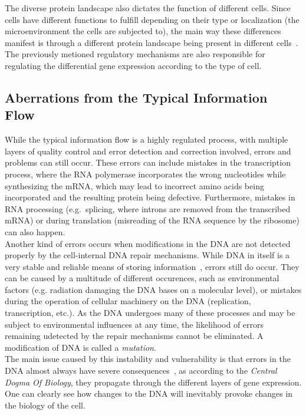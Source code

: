 The diverse protein landscape also dictates the function of different cells. Since cells have different functions to fulfill depending on their type or localization (the microenvironment the cells are subjected to), the main way these differences manifest is through a different protein landscape being present in different cells~\cite{molecular_cell_biology}.\\
The previously metioned regulatory mechanisms are also responsible for regulating the differential gene expression according to the type of cell.\\

\subsection{Aberrations from the Typical Information Flow}\label{subsec:cf_aberrations}
While the typical information flow is a highly regulated process, with multiple layers of quality control and error detection and correction involved, errors and problems can still occur. These errors can include mistakes in the transcription process, where the RNA polymerase incorporates the wrong nucleotides while synthesizing the mRNA, which may lead to incorrect amino acids being incorporated and the resulting protein being defective. Furthermore, mistakes in RNA processing (e.g.\ splicing, where introns are removed from the transcribed mRNA) or during translation (misreading of the RNA sequence by the ribosome) can also happen.\\
Another kind of errors occurs when modifications in the DNA are not detected properly by the cell-internal DNA repair mechanisms. While DNA in itself is a very stable and reliable means of storing information~\cite{molecular_biology_of_the_cell}, errors still do occur. They can be caused by a multitude of different occurences, such as environmental factors (e.g. radiation damaging the DNA bases on a molecular level), or mistakes during the operation of cellular machinery on the DNA (replication, transcription, etc.). As the DNA undergoes many of these processes and may be subject to environmental influences at any time, the likelihood of errors remaining udetected by the repair mechanisms cannot be eliminated. A modification of DNA is called a \emph{mutation}.\\
The main issue caused by this instability and vulnerability is that errors in the DNA almost always have severe consequences~\cite{dna_instability}, as according to the \emph{Central Dogma Of Biology}, they propagate through the different layers of gene expression. One can clearly see how changes to the DNA will inevitably provoke changes in the biology of the cell.\\
